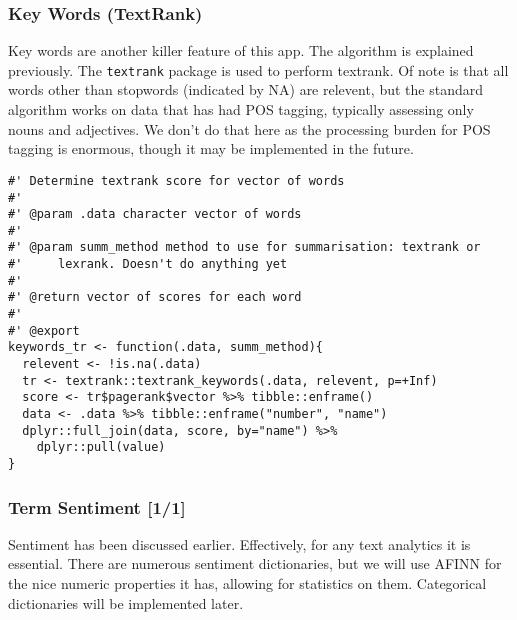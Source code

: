 \documentclass[a4paper, 11pt]{article}
\begin{document}
\subsubsection{Key Words (TextRank)}
\label{sec:orgae8ac88}
Key words are another killer feature of this app. The algorithm is
explained previously. The \texttt{textrank} package is used to perform
textrank. Of note is that all words other than stopwords (indicated by
NA) are relevent, but the standard algorithm works on data that has
had POS tagging, typically assessing only nouns and adjectives. We
don't do that here as the processing burden for POS tagging is
enormous, though it may be implemented in the future.
\begin{verbatim}
#' Determine textrank score for vector of words
#'
#' @param .data character vector of words
#'
#' @param summ_method method to use for summarisation: textrank or
#'     lexrank. Doesn't do anything yet
#'
#' @return vector of scores for each word
#'
#' @export
keywords_tr <- function(.data, summ_method){
  relevent <- !is.na(.data)
  tr <- textrank::textrank_keywords(.data, relevent, p=+Inf)
  score <- tr$pagerank$vector %>% tibble::enframe()
  data <- .data %>% tibble::enframe("number", "name")
  dplyr::full_join(data, score, by="name") %>%
    dplyr::pull(value)
}
\end{verbatim}

\subsubsection{Term Sentiment [1/1]}
\label{sec:orga14d63a}
Sentiment has been discussed earlier. Effectively, for any text
analytics it is essential. There are numerous sentiment dictionaries,
but we will use AFINN for the nice numeric properties it has, allowing
for statistics on them. Categorical dictionaries will be implemented
later.
\end{document}
